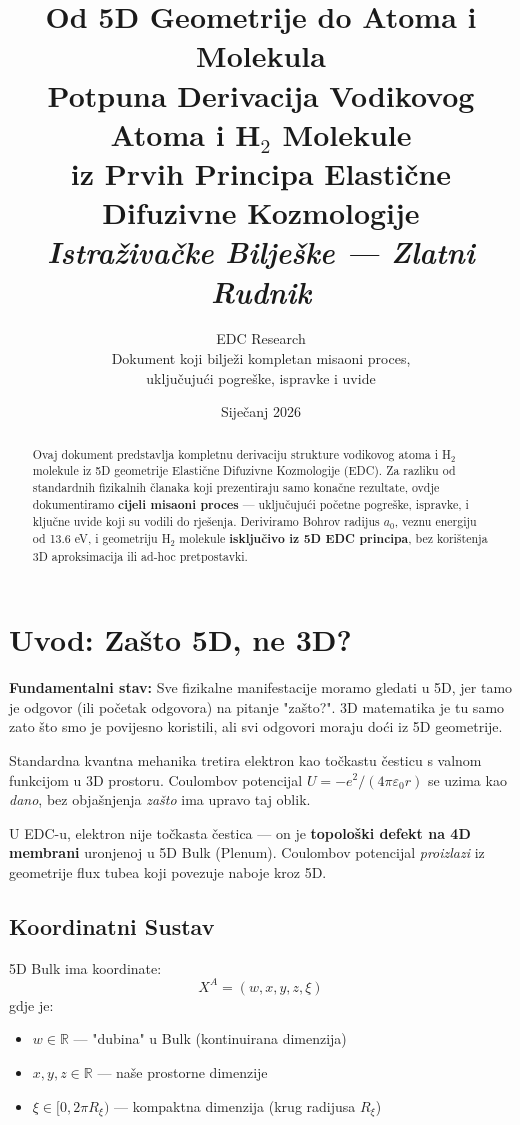 \documentclass[12pt,a4paper]{article}
\title{\Huge\textbf{Od 5D Geometrije do Atoma i Molekula} \\[0.5cm]
\Large Potpuna Derivacija Vodikovog Atoma i H$_2$ Molekule \\
iz Prvih Principa Elastične Difuzivne Kozmologije \\[1cm]
\normalsize\textit{Istraživačke Bilješke — Zlatni Rudnik}}
\author{EDC Research \\[0.3cm]
\small Dokument koji bilježi kompletan misaoni proces, \\
\small uključujući pogreške, ispravke i uvide}
\date{Siječanj 2026}
\begin{document}
\maketitle

\begin{abstract}
Ovaj dokument predstavlja kompletnu derivaciju strukture vodikovog atoma i H$_2$ molekule iz 5D geometrije Elastične Difuzivne Kozmologije (EDC). Za razliku od standardnih fizikalnih članaka koji prezentiraju samo konačne rezultate, ovdje dokumentiramo \textbf{cijeli misaoni proces} — uključujući početne pogreške, ispravke, i ključne uvide koji su vodili do rješenja. Deriviramo Bohrov radijus $a_0$, veznu energiju od 13.6 eV, i geometriju H$_2$ molekule \textbf{isključivo iz 5D EDC principa}, bez korištenja 3D aproksimacija ili ad-hoc pretpostavki.
\end{abstract}

\tableofcontents
\newpage

\section{Uvod: Zašto 5D, ne 3D?}

\begin{edcprinciple}
\textbf{Fundamentalni stav:} Sve fizikalne manifestacije moramo gledati u 5D, jer tamo je odgovor (ili početak odgovora) na pitanje "zašto?". 3D matematika je tu samo zato što smo je povijesno koristili, ali svi odgovori moraju doći iz 5D geometrije.
\end{edcprinciple}

Standardna kvantna mehanika tretira elektron kao točkastu česticu s valnom funkcijom u 3D prostoru. Coulombov potencijal $U = -e^2/(4\pi\varepsilon_0 r)$ se uzima kao \textit{dano}, bez objašnjenja \textit{zašto} ima upravo taj oblik.

U EDC-u, elektron nije točkasta čestica — on je \textbf{topološki defekt na 4D membrani} uronjenoj u 5D Bulk (Plenum). Coulombov potencijal \textit{proizlazi} iz geometrije flux tubea koji povezuje naboje kroz 5D.

\subsection{Koordinatni Sustav}

5D Bulk ima koordinate:
\begin{equation}
X^A = (w, x, y, z, \xi)
\end{equation}
gdje je:
\begin{itemize}
    \item $w \in \mathbb{R}$ — "dubina" u Bulk (kontinuirana dimenzija)
    \item $x, y, z \in \mathbb{R}$ — naše prostorne dimenzije
    \item $\xi \in [0, 2\pi R_\xi)$ — kompaktna dimenzija (krug radijusa $R_\xi$)
\end{itemize}
\end{document}
